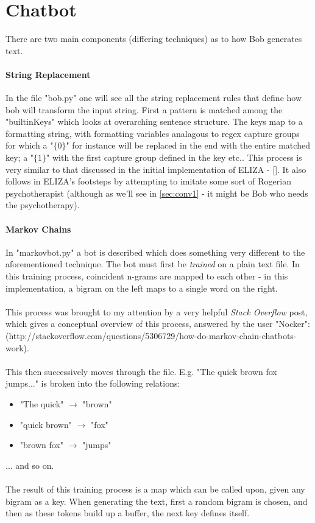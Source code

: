 \documentclass[]{article}
\begin{document}
\section{Chatbot}
There are two main components (differing techniques) as to how Bob generates text.
\paragraph{String Replacement} In the file "bob.py" one will see all the string replacement rules that define how bob will transform the input string. First a pattern is matched among the "builtinKeys" which looks at overarching sentence structure. The keys map to a formatting string, with formatting variables analagous to regex capture groups for which a "$\lbrace0\rbrace$" for instance will be replaced in the end with the entire matched key; a "$\lbrace1\rbrace$" with the first capture group defined in the key etc.. This process is very similar to that discussed in the initial implementation of ELIZA - \cite{Weizenbaum}[]. It also follows in ELIZA's footsteps by attempting to imitate some sort of Rogerian psychotherapist (although as we'll see in \ref{sec:conv1} - it might be Bob who needs the psychotherapy).

\paragraph{Markov Chains} In "markovbot.py" a bot is described which does something very different to the aforementioned technique. The bot must first be \emph{trained} on a plain text file. In this training process, coincident n-grams are mapped to each other - in this implementation, a bigram on the left maps to a single word on the right.
\\\\
This process was brought to my attention by a very helpful \emph{Stack Overflow} post, which gives a conceptual overview of this process, answered by the user "Nocker": (http://stackoverflow.com/questions/5306729/how-do-markov-chain-chatbots-work).
\\\\
This then successively moves through the file. E.g. "The quick brown fox jumps..." is broken into the following relations:
\begin{itemize}
	\item "The quick" $\rightarrow$ "brown"
	\item "quick brown" $\rightarrow$ "fox"
	\item "brown fox" $\rightarrow$ "jumps"
\end{itemize}
... and so on.
\\\\
The result of this training process is a map which can be called upon, given any bigram as a key. When generating the text, first a random bigram is chosen, and then as these tokens build up a buffer, the next key defines itself.
\end{document}
